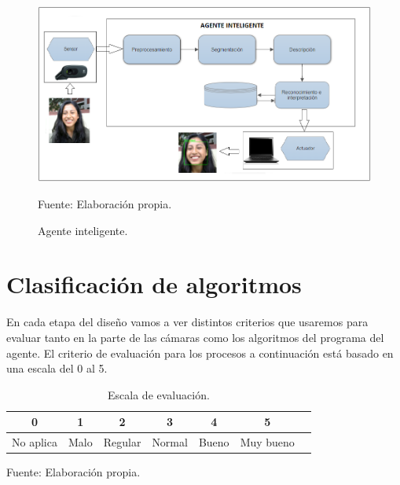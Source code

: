 \begin{figure}[ht]
\begin{center}
\includegraphics[width=1\textwidth]{Imagen26}
\end{center}
\begin{center}
\vskip -0.5cm
\caption{\small{Agente inteligente.}}
{\small{Fuente: Elaboración propia.}}
\end{center}
\end{figure}

\vskip 3cm

\section{Clasificación de algoritmos}
En cada etapa del diseño vamos a ver distintos criterios que usaremos para evaluar tanto en la parte de las cámaras como los algoritmos del programa del agente. El criterio de evaluación para los procesos a continuación está basado en una escala del 0
al 5.

\begin{table}[ht!]
\centering
\caption{Escala de evaluación.} \vskip 0.1cm
\begin{tabular}{|c|c|c|c|c|c|c|} \hline
\bf 0 & \bf 1 & \bf 2 & \bf 3 & \bf 4 & \bf 5 \\ \hline
No aplica & Malo & Regular & Normal & Bueno & Muy bueno \\ \hline 
\end{tabular}
\begin{center}
{\small{Fuente: Elaboración propia.}}
\end{center}
\end{table}
\vskip 3cm

